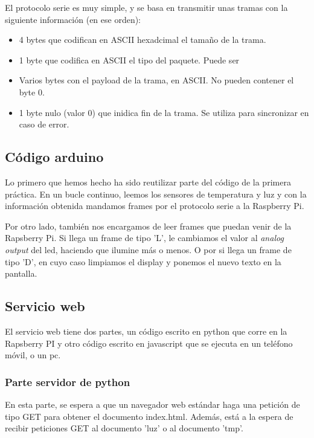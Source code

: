 \documentclass[]{article}
\begin{document}
El protocolo serie es muy simple, y se basa en transmitir unas tramas con la siguiente información (en ese orden):

\begin{itemize}
	\item 4 bytes que codifican en ASCII hexadcimal el tamaño de la trama.
	\item 1 byte que codifica en ASCII el tipo del paquete. Puede ser %
	\item Varios bytes con el payload de la trama, en ASCII. No pueden contener el byte 0.
	\item 1 byte nulo (valor 0) que inidica fin de la trama. Se utiliza para sincronizar en caso de error.
\end{itemize}

\subsection{Código arduino}

Lo primero que hemos hecho ha sido reutilizar parte del código de la primera práctica. En un bucle continuo, leemos los sensores de temperatura y luz y con la información obtenida mandamos frames por el protocolo serie a la Raspberry Pi.

\hfill

Por otro lado, también nos encargamos de leer frames que puedan venir de la Rapsberry Pi. Si llega un frame de tipo 'L', le cambiamos el valor al \textit{analog output} del led, haciendo que ilumine más o menos. O por si llega un frame de tipo 'D', en cuyo caso limpiamos el display y ponemos el nuevo texto en la pantalla.

\subsection{Servicio web}
El servicio web tiene dos partes, un código escrito en python que corre en la Rapsberry PI y otro código escrito en javascript que se ejecuta en un teléfono móvil, o un pc.

\subsubsection{Parte servidor de python}
En esta parte, se espera a que un navegador web estándar haga una petición de tipo GET para obtener el documento index.html. Además, está a la espera de recibir peticiones GET al documento 'luz' o al documento 'tmp'.

\hfill
\end{document}
